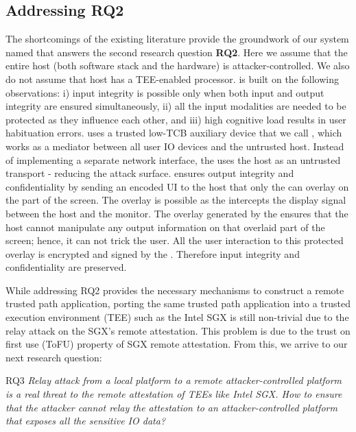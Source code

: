     \subsection{Addressing RQ2}
The shortcomings of the existing literature provide the groundwork of our system named \protection that answers the second research question \textbf{RQ2}. Here we assume that the entire host (both software stack and the hardware) is attacker-controlled. We also do not assume that host has a TEE-enabled processor. \protection is built on the following observations: i) input integrity is possible only when both input and output integrity are ensured simultaneously, ii) all the input modalities are needed to be protected as they influence each other, and iii) high cognitive load results in user habituation errors. \protection uses a trusted low-TCB auxiliary device that we call \deviceprotection, which works as a mediator between all user IO devices and the untrusted host. Instead of implementing a separate network interface, the \deviceprotection uses the host as an untrusted transport - reducing the attack surface. \protection ensures output integrity and confidentiality by sending an encoded UI to the host that only the \deviceprotection can overlay on the part of the screen. The overlay is possible as the \deviceprotection intercepts the display signal between the host and the monitor. The overlay generated by the \deviceprotection ensures that the host cannot manipulate any output information on that overlaid part of the screen; hence, it can not trick the user. All the user interaction to this protected overlay is encrypted and signed by the \deviceprotection. Therefore input integrity and confidentiality are preserved.


While addressing RQ2 provides the necessary mechanisms to construct a remote trusted path application, porting the same trusted path application into a trusted execution environment (TEE) such as the Intel SGX is still non-trivial due to the relay attack on the SGX's remote attestation. This problem is due to the trust on first use (ToFU) property of SGX remote attestation. From this, we arrive to our next research question: 

\begin{mybox}[colback=white]{RQ3}
\emph{Relay attack from a local platform to a remote attacker-controlled platform is a real threat to the remote attestation of TEEs like Intel SGX. How to ensure that the attacker cannot relay the attestation to an attacker-controlled platform that exposes all the sensitive IO data?}
\end{mybox}


